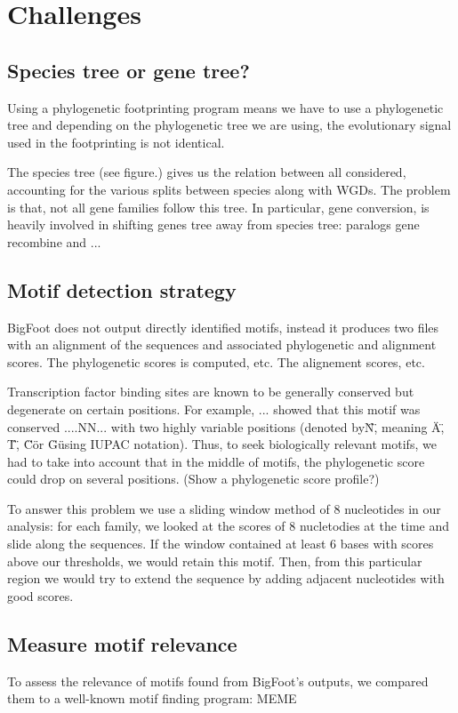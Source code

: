 \section{Challenges}

\subsection{Species tree or gene tree?}

Using a phylogenetic footprinting program means we have to use a phylogenetic tree and depending on the phylogenetic tree we are using, the evolutionary signal used in the footprinting is not identical.

The species tree (see figure.) gives us the relation between all considered, accounting for the various splits between species along with WGDs. The problem is that, not all gene families follow this tree. In particular, gene conversion, is heavily involved in shifting genes tree away from species tree: paralogs gene recombine and ...

\subsection{Motif detection strategy}

BigFoot does not output directly identified motifs, instead it produces two files with an alignment of the sequences and associated phylogenetic and alignment scores. The phylogenetic scores is computed, etc. The alignement scores, etc.

Transcription factor binding sites are known to be generally conserved but degenerate on certain positions. For example, ... showed that this motif was conserved ....NN... with two highly variable positions (denoted by\"N\", meaning \"A\", \"T\", \"C\" or \"G\" using IUPAC notation). Thus, to seek biologically relevant motifs, we had to take into account that in the middle of motifs, the phylogenetic score could drop on several positions. (Show a phylogenetic score profile?)

To answer this problem we use a sliding window method of 8 nucleotides in our analysis: for each family, we looked at the scores of 8 nucletodies at the time and slide along the sequences. If the window contained at least 6 bases with scores above our thresholds, we would retain this motif. Then, from this particular region we would try to extend the sequence by adding adjacent nucleotides with good scores.

\subsection{Measure motif relevance}

To assess the relevance of motifs found from BigFoot's outputs, we compared them to a well-known motif finding program: MEME